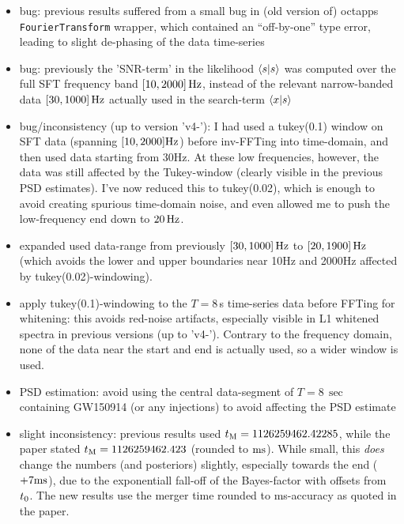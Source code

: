 \documentclass[aps,prd,onecolumn,notitlepage,nofootinbib,superscriptaddress,altaffilletter,floatfix]{revtex4-1}
\begin{document}
\begin{itemize}
\item bug: previous results suffered from a small bug in (old version of) octapps \texttt{FourierTransform} wrapper, which contained an ``off-by-one'' type
  error, leading to slight de-phasing of the data time-series

\item bug: previously the 'SNR-term' in the likelihood $\left\langle s\middle|s\right\rangle$ was computed over the full SFT frequency band $[10,2000]\,\mathrm{Hz}$, instead of
  the relevant narrow-banded data $[30,1000]\,\mathrm{Hz}$ actually used in the search-term $\left\langle x\middle|s\right\rangle$

\item bug/inconsistency (up to version 'v4-'): I had used a tukey(0.1) window on SFT data (spanning ${[10,2000]}\mathrm{Hz}$) before inv-FFTing into
  time-domain, and then used data starting from 30Hz. At these low frequencies, however, the data was still affected by the Tukey-window (clearly
  visible in the previous PSD estimates). I've now reduced this to tukey(0.02), which is enough to avoid creating spurious time-domain noise, and even
  allowed me to push the low-frequency end down to $20\,\mathrm{Hz}$.

\item expanded used data-range from previously ${[30,1000]}\,\mathrm{Hz}$ to ${[20,1900]}\,\mathrm{Hz}$ (which avoids the lower and upper boundaries near 10Hz and 2000Hz affected by tukey(0.02)-windowing).

\item apply tukey(0.1)-windowing to the $T=8\,$s time-series data before FFTing for whitening: this avoids red-noise artifacts, especially visible in
  L1 whitened spectra in previous versions (up to 'v4-'). Contrary to the frequency domain, none of the data near the start and end is actually used,
  so a wider window is used.

\item PSD estimation: avoid using the central data-segment of $T=8\,\sec$ containing GW150914 (or any injections) to avoid affecting the PSD estimate

\item slight inconsistency: previous results used  $t_{\mathrm{M}} = 1126259462.42285$, while the paper stated  $t_{\mathrm{M}} = 1126259462.423$
  (rounded to $\mathrm{ms}$). While small, this \emph{does} change the numbers (and posteriors) slightly, especially towards the end ($+7\mathrm{ms}$), due to the
  exponentiall fall-off of the Bayes-factor with offsets from $t_0$. The new results use the merger time rounded to ms-accuracy as quoted in the
  paper.


\end{itemize}
\end{document}
